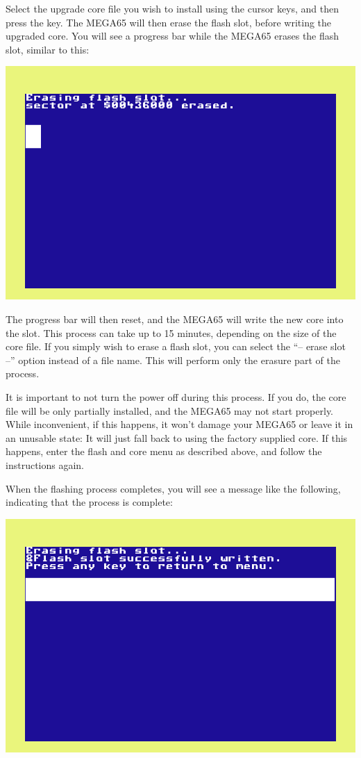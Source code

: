 Select the upgrade core file you wish to
install using the cursor keys, and then press the  key.  The MEGA65 will then erase
the flash slot, before writing the upgraded core.  You will see a progress bar while the MEGA65 erases
the flash slot, similar to this:

\includegraphics[width=\linewidth]{images/ss-flashmenu-erasing.png}

The progress bar will then reset, and the MEGA65 will
write the new core into the slot. This process can take up to 15
minutes, depending on the size of the core file.  If you simply wish
to erase a flash slot, you can select the
``-- erase slot --'' option instead of a file name. This will perform
only the erasure part of the process.

It is important to not turn the power off during this process. If you do, the core file will be
only partially installed, and the MEGA65 may not start properly.
While
inconvenient, if this happens, it won't damage your MEGA65 or leave it
in an unusable state: It will just fall back to using the factory
supplied core.
If this happens, enter the flash and core
menu as described above, and follow the instructions again.

When the flashing process completes, you will see a message like the following, indicating that the process is complete:

\includegraphics[width=\linewidth]{images/ss-flashmenu-done.png}


